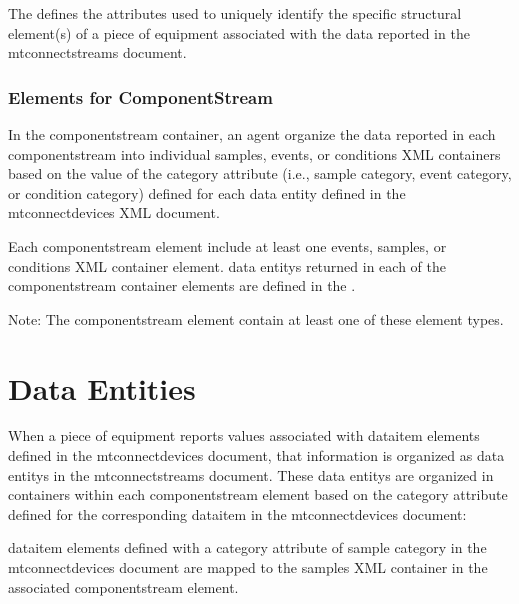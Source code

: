 The  defines the attributes used to uniquely identify the specific \gls{structural element}(s) of a piece of equipment associated with the data reported in the \gls{mtconnectstreams} document.  



\subsubsection{Elements for ComponentStream}

In the \gls{componentstream} container, an \gls{agent} \must organize the data reported in each \gls{componentstream} into individual \gls{samples}, \gls{events}, or \gls{conditions} XML containers based on the value of the \gls{category} attribute (i.e., \gls{sample category}, \gls{event category}, or \gls{condition category}) defined for each \gls{data entity} defined in the \gls{mtconnectdevices} XML document.

Each \gls{componentstream} element \must include at least one \gls{events}, \gls{samples}, or \gls{conditions} XML container element.   \glspl{data entity} returned in each of the \gls{componentstream} container elements are defined in the . 



\begin{note}
Note: \notesign The \gls{componentstream} element \must contain at least one of these element types.

\end{note}

\section{Data Entities}\label{sec:Data Entities}

When a piece of equipment reports values associated with \gls{dataitem} elements defined in the \gls{mtconnectdevices} document, that information is organized as \glspl{data entity} in the \gls{mtconnectstreams} document.   These \glspl{data entity} are organized in containers within each \gls{componentstream} element based on the \gls{category} attribute defined for the corresponding \gls{dataitem} in the \gls{mtconnectdevices} document:

\tab \gls{dataitem} elements defined with a \gls{category} attribute of \gls{sample category} in the \gls{mtconnectdevices} document are mapped to the \gls{samples} XML container in the associated \gls{componentstream} element.

